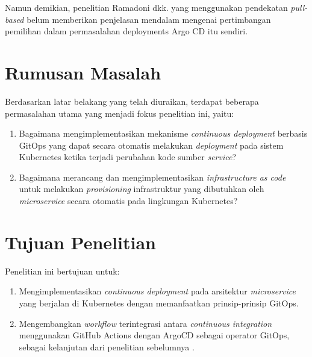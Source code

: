 Namun demikian, penelitian Ramadoni dkk. \cite{Ramadoni2021} yang menggunakan pendekatan
\textit{pull-based} belum memberikan penjelasan mendalam mengenai pertimbangan pemilihan dalam permasalahan deployments Argo CD itu sendiri.
\vspace{0.5cm}
\newpage
\section{Rumusan Masalah}
Berdasarkan latar belakang yang telah diuraikan, terdapat beberapa permasalahan utama yang menjadi fokus penelitian ini, yaitu:
\begin{enumerate}[label=\alph*., leftmargin=1.5\parindent]
    \item Bagaimana mengimplementasikan mekanisme \textit{continuous deployment} berbasis GitOps yang dapat secara otomatis melakukan \textit{deployment} pada sistem Kubernetes ketika terjadi perubahan kode sumber \textit{service}?
    \item Bagaimana merancang dan mengimplementasikan \textit{infrastructure as code} untuk melakukan \textit{provisioning} infrastruktur yang dibutuhkan oleh \textit{microservice} secara otomatis pada lingkungan Kubernetes?
\end{enumerate}

\vspace{0.5cm}
\section{Tujuan Penelitian}
Penelitian ini bertujuan untuk:
\begin{enumerate}[label=\alph*., leftmargin=1.5\parindent]
    \item Mengimplementasikan \textit{continuous deployment} pada arsitektur \textit{microservice} yang berjalan di Kubernetes dengan memanfaatkan prinsip-prinsip GitOps.
    \item Mengembangkan \textit{workflow} terintegrasi antara \textit{continuous integration} menggunakan GitHub Actions dengan ArgoCD sebagai operator GitOps, sebagai kelanjutan dari penelitian sebelumnya \cite{Ramadoni2021}.
\end{enumerate}

